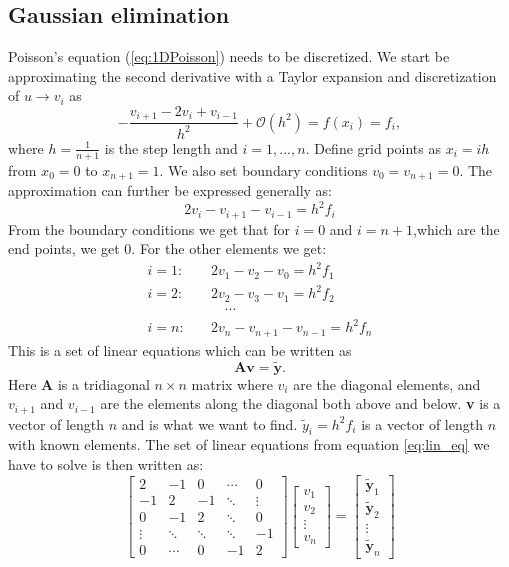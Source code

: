 \documentclass[12pt,a4paper,english]{article}
\begin{document}
\subsection{Gaussian elimination}
Poisson's equation (\ref{eq:1DPoisson}) needs to be discretized. We start be approximating the second derivative with a Taylor expansion and discretization of $u \rightarrow v_i$ as
\begin{equation}
\label{eq:approx}
-\frac{v_{i+1}-2v_i+v_{i-1}}{h^2}+\mathcal{O}(h^2)=f(x_i)=f_i,
\end{equation}
where $h=\frac{1}{n+1}$ is the step length and $i=1,...,n$. Define grid points as $x_i=ih$ from $x_0=0$ to $x_{n+1}=1$. We also set boundary conditions $v_0=v_{n+1}=0$. The approximation can further be expressed generally as:
\begin{equation}
\label{eq:approx_gen}
2v_i-v_{i+1}-v_{i-1}=h^2f_i
\end{equation}
From the boundary conditions we get that for $i=0$ and $i=n+1$,which are the end points, we get 0. For the other elements we get:
\begin{align*}
i=1:&\quad 2v_1-v_{2}-v_{0}=h^2f_1\\
i=2:&\quad 2v_2-v_{3}-v_{1}=h^2f_2\\
&\qquad\cdots\\
i=n:&\quad 2v_n-v_{n+1}-v_{n-1}=h^2f_n
\end{align*}
This is a set of linear equations which can be written as
\begin{equation}
\label{eq:lin_eq}
\textbf{A}\textbf{v}=\tilde{\textbf{y}}.
\end{equation}
Here \textbf{A} is a tridiagonal $n\times n$ matrix where $v_i$ are the diagonal elements, and $v_{i+1}$ and $v_{i-1}$ are the elements along the diagonal both above and below. \textbf{v} is a vector of length $n$ and is what we want to find. $\tilde{y}_i=h^2f_i$ is a vector of length $n$ with known elements. The set of linear equations from equation \ref{eq:lin_eq} we have to solve is then written as:
\begin{equation}
\label{eq:matrix_lin_eq}
\begin{bmatrix}
2 & -1 & 0 & \cdots & 0\\
-1 & 2 & -1 &\ddots & \vdots\\
0 & -1 & 2 & \ddots & 0\\
\vdots & \ddots & \ddots & \ddots & -1\\
0 & \cdots & 0 & -1 & 2
\end{bmatrix}
\begin{bmatrix}
v_1\\
v_2\\
\vdots\\
v_n
\end{bmatrix} = 
\begin{bmatrix}
\tilde{\textbf{y}}_1\\
\tilde{\textbf{y}}_2\\
\vdots\\
\tilde{\textbf{y}}_n
\end{bmatrix}
\end{equation}
\end{document}
